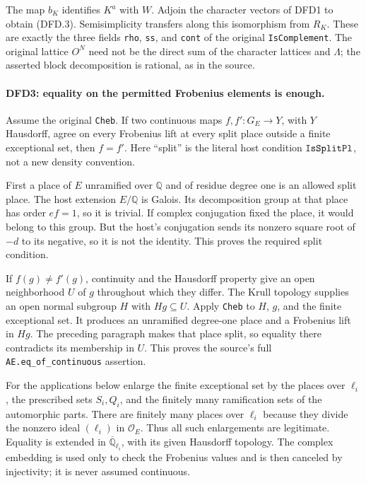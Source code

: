 \documentclass[11pt,a4paper]{article}
\numberwithin{equation}{section}
\theoremstyle{remark}\newtheorem{remark}[theorem]{Remark}
\begin{document}
The map $b_K$ identifies $K^a$ with $W$. Adjoin the character
vectors of DFD1 to obtain (DFD.3). Semisimplicity transfers along
this isomorphism from $R_K$. These are exactly the three fields
\texttt{rho}, \texttt{ss}, and \texttt{cont} of the original
\texttt{Is\allowbreak Complement}. The original lattice $O^N$ need not be
the direct sum of the character lattices and $\Lambda$; the
asserted block decomposition is rational, as in the source.

\paragraph{DFD3: equality on the permitted Frobenius elements is enough.}
\label{claim:DFD3}
Assume the original \texttt{Cheb}. If two continuous maps
$f,f':G_E\to Y$, with $Y$ Hausdorff, agree on every Frobenius lift
at every split place outside a finite exceptional set, then $f=f'$.
Here ``split'' is the literal host condition
$\texttt{Is\allowbreak Split\allowbreak Pl}$, not a new density convention.

First a place of $E$ unramified over $\mathbb Q$ and of residue
degree one is an allowed split place. The host extension
$E/\mathbb Q$ is Galois. Its decomposition group at that place
has order $ef=1$, so it is trivial. If complex conjugation fixed
the place, it would belong to this group. But the host's
conjugation sends its nonzero square root of $-d$ to its negative,
so it is not the identity. This proves the required split
condition.

If $f(g)\ne f'(g)$, continuity and the Hausdorff property give an
open neighborhood $U$ of $g$ throughout which they differ.
The Krull topology supplies an open normal subgroup $H$ with
$Hg\subseteq U$. Apply \texttt{Cheb} to $H$, $g$, and the finite
exceptional set. It produces an unramified degree-one place and
a Frobenius lift in $Hg$. The preceding paragraph makes that
place split, so equality there contradicts its membership in
$U$. This proves the source's full
\texttt{AE.\allowbreak eq\_\allowbreak of\_\allowbreak continuous} assertion.

For the applications below enlarge the finite exceptional set
by the places over $\ell_i$, the prescribed sets $S_i,Q_i$, and
the finitely many ramification sets of the automorphic parts.
There are finitely many places over $\ell_i$ because they divide
the nonzero ideal $(\ell_i)$ in $\mathcal O_E$. Thus all such
enlargements are legitimate. Equality is extended in
$\overline{\mathbb Q}_{\ell_i}$, with its given Hausdorff
topology. The complex embedding is used only to check the
Frobenius values and is then canceled by injectivity; it is
never assumed continuous.
\end{document}
